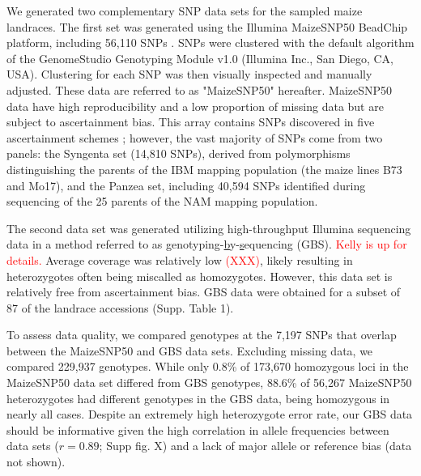 We generated two complementary SNP data sets for the sampled maize landraces. 
The first set was generated using the Illumina MaizeSNP50 BeadChip platform, including 56,110
SNPs \cite[]{Ganal_2011_22174790}.  SNPs were clustered with the default algorithm of the GenomeStudio Genotyping Module v1.0 (Illumina Inc., San Diego, CA, USA).   
Clustering for each SNP was then visually inspected and manually adjusted.  
These data are referred to as "MaizeSNP50" hereafter.  
MaizeSNP50 data have high reproducibility and a low proportion of missing data but are subject to ascertainment bias. 
This array contains SNPs discovered in five ascertainment schemes \cite[]{Ganal_2011_22174790}; however, the vast majority of SNPs come from two panels: the Syngenta set (14,810 SNPs), derived from polymorphisms distinguishing the parents of the IBM mapping population (the maize lines B73 and Mo17), and the Panzea set, including 40,594 SNPs identified during sequencing of the 25 parents of the NAM mapping population.  

The second data set was generated utilizing high-throughput Illumina sequencing data in a method referred to as \underline{g}enotyping-\underline{b}y-\underline{s}equencing (GBS).  \textcolor{red}{Kelly is up for details.}
Average coverage was relatively low \textcolor{red}{(XXX)}, likely resulting in heterozygotes often being miscalled as homozygotes.  However, this data set is relatively free from ascertainment bias.       
GBS data were obtained for a subset of 87 of the landrace accessions (Supp. Table 1). 

To assess data quality, we compared genotypes at the 7,197 SNPs that overlap between the MaizeSNP50 and GBS data sets. 
Excluding missing data, we compared 229,937 genotypes. 
While only 0.8\% of 173,670 homozygous loci in the MaizeSNP50 data set differed from GBS genotypes, 88.6\% of 56,267 MaizeSNP50 heterozygotes had different genotypes in the GBS data, being homozygous in nearly all cases. 
Despite an extremely high heterozygote error rate, our GBS data should be informative given the high correlation in allele frequencies between data sets ($r=0.89$; Supp fig. X) and a lack of major allele or reference bias (data not shown).

